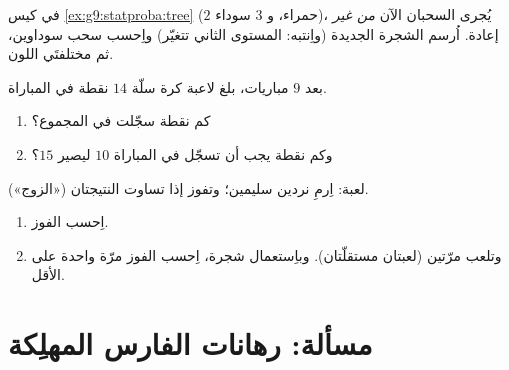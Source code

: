 \begin{exercise}[$\star\star$]\label{exo:g9:statproba:7}
في كيس \cref{ex:g9:statproba:tree} ($2$ حمراء، و $3$ سوداء)،
يُجرى السحبان الآن \emph{من غير} إعادة. اُرسم الشجرة الجديدة
(واِنتبه:  المستوى الثاني تتغيّر) واِحسب
 سحب  سوداوين، ثم  مختلفتَي اللون.
\end{exercise}

\begin{exercise}[$\star\star$]\label{exo:g9:statproba:8}
بعد $9$ مباريات، بلغ  لاعبة كرة سلّة $14$ نقطة في المباراة.
\begin{enumerate}
  \item كم نقطة سجّلت في المجموع؟
  \item وكم نقطة يجب أن تسجّل في المباراة $10$ ليصير 
        $15$؟
\end{enumerate}
\end{exercise}

\begin{exercise}[$\star\star\star$]\label{exo:g9:statproba:9}
لعبة: اِرمِ نردين سليمين؛ وتفوز إذا تساوت النتيجتان
(«الزوج»).
\begin{enumerate}
  \item اِحسب  الفوز.
  \item وتلعب مرّتين (لعبتان مستقلّتان). وباِستعمال شجرة، اِحسب
         الفوز مرّة واحدة على الأقل.
\end{enumerate}
\end{exercise}

\section{مسألة: رهانات الفارس المهلِكة}

